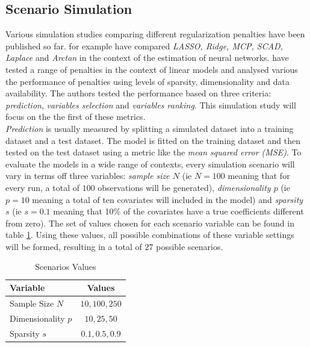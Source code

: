 \documentclass[12pt,a4paper]{article}
\begin{document}
\subsection{Scenario Simulation}
Various simulation studies comparing different regularization penalties have been published so far. \textcite{VettamJohn2022} for example have compared \textit{LASSO, Ridge, MCP, SCAD, Laplace} and \textit{Arctan} in the context of the estimation of neural networks. \textcite{WangEtAl2020} have tested a range of penalties in the context of linear models and analysed various the performance of penalties using levels of sparsity, dimensionality and data availability. The authors tested the performance based on three criteria: \textit{prediction}, \textit{variables selection} and \textit{variables ranking}. This simulation study will focus on the the first of these metrics.\\

\textit{Prediction} is usually measured by splitting a simulated dataset into a training dataset and a test dataset. The model is fitted on the training dataset and then tested on the test dataset using a metric like the \textit{mean squared error (MSE)}. To evaluate the models in a wide range of contexts, every simulation scenario will vary in terms off three variables: \textit{sample size $N$} (ie $N=100$ meaning that for every run, a total of $100$ observations will be generated), \textit{dimensionality $p$} (ie $p=10$ meaning a total of ten covariates will included in the model) and \textit{sparsity $s$} (ie $s=0.1$ meaning that 10\% of the covariates have a true coefficients different from zero). The set of values chosen for each scenario variable can be found in table \ref{tab:Scenarios}. Using these values, all possible combinations of these variable settings will be formed, resulting in a total of $27$ possible scenarios. 

\begin{table}[h!]
\begin{center}
\begin{tabular}{lc}\toprule
Variable & Values\\\midrule
Sample Size $N$ & $10, 100, 250$\\
Dimensionality $p$ & $10, 25, 50$\\
Sparsity $s$ & $0.1, 0.5, 0.9$\\\bottomrule
\end{tabular}
\caption{Scenarios Values}
\label{tab:Scenarios}
\end{center}
\end{table}
\end{document}
